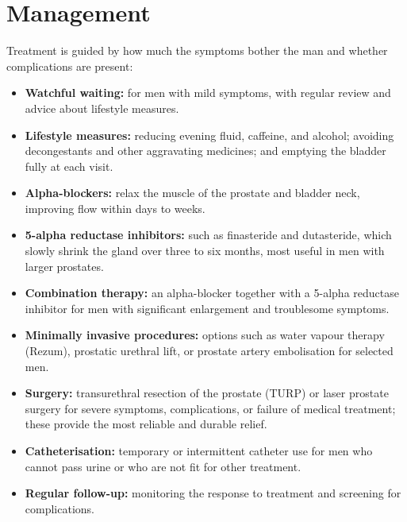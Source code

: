 \section*{Management}
Treatment is guided by how much the symptoms bother the man and whether complications are present:
\begin{itemize}
    \item \textbf{Watchful waiting:} for men with mild symptoms, with regular review and advice about lifestyle measures.
    \item \textbf{Lifestyle measures:} reducing evening fluid, caffeine, and alcohol; avoiding decongestants and other aggravating medicines; and emptying the bladder fully at each visit.
    \item \textbf{Alpha-blockers:} relax the muscle of the prostate and bladder neck, improving flow within days to weeks.
    \item \textbf{5-alpha reductase inhibitors:} such as finasteride and dutasteride, which slowly shrink the gland over three to six months, most useful in men with larger prostates.
    \item \textbf{Combination therapy:} an alpha-blocker together with a 5-alpha reductase inhibitor for men with significant enlargement and troublesome symptoms.
    \item \textbf{Minimally invasive procedures:} options such as water vapour therapy (Rezum), prostatic urethral lift, or prostate artery embolisation for selected men.
    \item \textbf{Surgery:} transurethral resection of the prostate (TURP) or laser prostate surgery for severe symptoms, complications, or failure of medical treatment; these provide the most reliable and durable relief.
    \item \textbf{Catheterisation:} temporary or intermittent catheter use for men who cannot pass urine or who are not fit for other treatment.
    \item \textbf{Regular follow-up:} monitoring the response to treatment and screening for complications.
\end{itemize}

